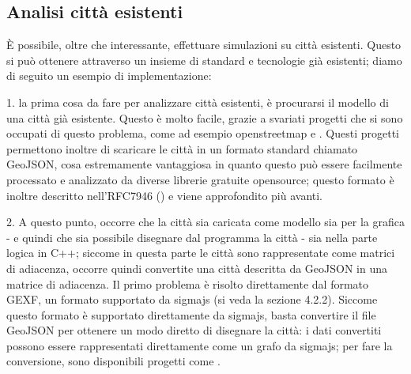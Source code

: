 \documentclass[main.tex]{subfiles}
\begin{document}
\subsection{Analisi città esistenti}
È possibile, oltre che interessante, effettuare simulazioni su città esistenti. Questo si può ottenere attraverso un insieme di standard e tecnologie già esistenti; diamo di seguito un esempio di implementazione:

1. la prima cosa da fare per analizzare città esistenti, è procurarsi il modello di una città già esistente. Questo è molto facile, grazie a svariati progetti che si sono occupati di questo problema, come ad esempio openstreetmap e \cite{cityjson}. Questi progetti permettono inoltre di scaricare le città in un formato standard chiamato GeoJSON, cosa estremamente vantaggiosa in quanto questo può essere facilmente processato e analizzato da diverse librerie gratuite opensource; questo formato è inoltre descritto nell'RFC7946 (\cite{roba}) e viene approfondito più avanti.

2. A questo punto, occorre che la città sia caricata come modello sia per la grafica - e quindi che sia possibile disegnare dal programma la città - sia nella parte logica in C++; siccome in questa parte le città sono rappresentate come matrici di adiacenza, occorre quindi convertite una città descritta da GeoJSON in una matrice di adiacenza. Il primo problema è risolto direttamente dal formato GEXF, un formato supportato da sigmajs (si veda la sezione 4.2.2). Siccome questo formato è supportato direttamente da sigmajs, basta convertire il file GeoJSON per ottenere un modo diretto di disegnare la città: i dati convertiti possono essere rappresentati direttamente come un grafo da sigmajs; per fare la conversione, sono disponibili progetti come \cite{open}.
\end{document}
